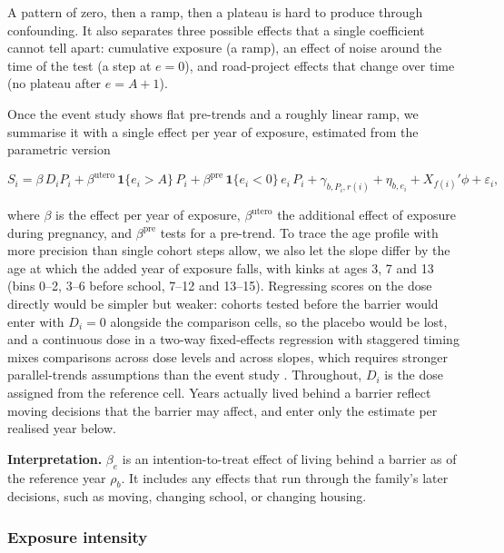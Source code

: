\documentclass[11pt]{article}
\begin{document}
A pattern of zero, then a ramp, then a plateau is hard to produce through confounding. It also separates three possible effects that a single coefficient cannot tell apart: cumulative exposure (a ramp), an effect of noise around the time of the test (a step at \(e = 0\)), and road-project effects that change over time (no plateau after \(e = A + 1\)).

Once the event study shows flat pre-trends and a roughly linear ramp, we summarise it with a single effect per year of exposure, estimated from the parametric version

\[
S_i = \beta\, D_i P_i + \beta^{\text{utero}}\, \mathbf{1}\{e_i > A\}\, P_i + \beta^{\text{pre}}\, \mathbf{1}\{e_i < 0\}\, e_i\, P_i + \gamma_{b,P_i,r(i)} + \eta_{b,e_i} + X_{f(i)}'\phi + \varepsilon_i ,
\]

where \(\beta\) is the effect per year of exposure, \(\beta^{\text{utero}}\) the additional effect of exposure during pregnancy, and \(\beta^{\text{pre}}\) tests for a pre-trend. To trace the age profile with more precision than single cohort steps allow, we also let the slope differ by the age at which the added year of exposure falls, with kinks at ages 3, 7 and 13 (bins 0--2, 3--6 before school, 7--12 and 13--15). Regressing scores on the dose directly would be simpler but weaker: cohorts tested before the barrier would enter with \(D_i = 0\) alongside the comparison cells, so the placebo would be lost, and a continuous dose in a two-way fixed-effects regression with staggered timing mixes comparisons across dose levels and across slopes, which requires stronger parallel-trends assumptions than the event study \autocite{callawayDifferenceinDifferencesContinuousTreatment2024}. Throughout, \(D_i\) is the dose assigned from the reference cell. Years actually lived behind a barrier reflect moving decisions that the barrier may affect, and enter only the estimate per realised year below.

\textbf{Interpretation.} \(\beta_e\) is an intention-to-treat effect of living behind a barrier as of the reference year \(\rho_b\). It includes any effects that run through the family's later decisions, such as moving, changing school, or changing housing.

\subsubsection{Exposure intensity}
\end{document}
